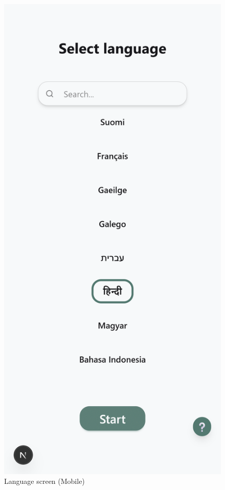 \begin{figure}[H]
    \centering
    \includegraphics[height=0.3\textheight,keepaspectratio]{images/Screenshots/1_language_mobile.png}
    \caption{Language screen (Mobile)}
\end{figure}


